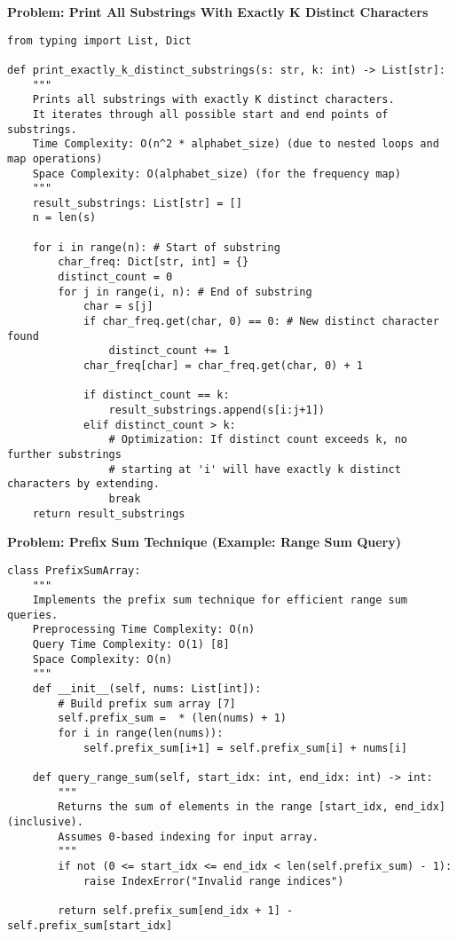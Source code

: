 \noindent\textbf{Problem: Print All Substrings With Exactly K Distinct Characters}
\begin{verbatim}
from typing import List, Dict

def print_exactly_k_distinct_substrings(s: str, k: int) -> List[str]:
    """
    Prints all substrings with exactly K distinct characters.
    It iterates through all possible start and end points of substrings. 
    Time Complexity: O(n^2 * alphabet_size) (due to nested loops and map operations)
    Space Complexity: O(alphabet_size) (for the frequency map)
    """
    result_substrings: List[str] = []
    n = len(s)

    for i in range(n): # Start of substring
        char_freq: Dict[str, int] = {}
        distinct_count = 0
        for j in range(i, n): # End of substring
            char = s[j]
            if char_freq.get(char, 0) == 0: # New distinct character found
                distinct_count += 1
            char_freq[char] = char_freq.get(char, 0) + 1
            
            if distinct_count == k:
                result_substrings.append(s[i:j+1])
            elif distinct_count > k:
                # Optimization: If distinct count exceeds k, no further substrings
                # starting at 'i' will have exactly k distinct characters by extending.
                break 
    return result_substrings
\end{verbatim}

\noindent\textbf{Problem: Prefix Sum Technique (Example: Range Sum Query)}
\begin{verbatim}
class PrefixSumArray:
    """
    Implements the prefix sum technique for efficient range sum queries.
    Preprocessing Time Complexity: O(n)
    Query Time Complexity: O(1) [8]
    Space Complexity: O(n)
    """
    def __init__(self, nums: List[int]):
        # Build prefix sum array [7]
        self.prefix_sum =  * (len(nums) + 1)
        for i in range(len(nums)):
            self.prefix_sum[i+1] = self.prefix_sum[i] + nums[i]
            
    def query_range_sum(self, start_idx: int, end_idx: int) -> int:
        """
        Returns the sum of elements in the range [start_idx, end_idx] (inclusive).
        Assumes 0-based indexing for input array.
        """
        if not (0 <= start_idx <= end_idx < len(self.prefix_sum) - 1):
            raise IndexError("Invalid range indices")
        
        return self.prefix_sum[end_idx + 1] - self.prefix_sum[start_idx]
\end{verbatim}

